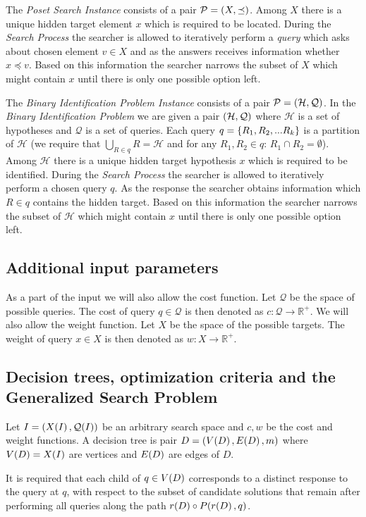 The \textit{Poset Search Instance} consists of a pair $\mathcal{P}=\mathopen{}\left( X, \preceq \right)$. Among $X$ there is a unique hidden target element $x$ which is required
to be located. During the \textit{Search Process} the searcher is allowed to iteratively perform a \textit{query} which asks about chosen element $v\in X$ and as the answers receives information whether $x\preceq v$. Based on this information the searcher narrows the subset of $X$ which might contain $x$ until there is only one possible option left.

The \textit{Binary Identification Problem Instance} consists of a pair $\mathcal{P}=\mathopen{}\left( \mathcal{H}, \mathcal{Q} \right)$. In the \textit{Binary Identification Problem} we are given a pair $\mathopen{}\left( \mathcal{H}, \mathcal{Q} \right)$ where $\mathcal{H}$ is a set of hypotheses and $\mathcal{Q}$ is a set of queries. Each query $q = \mathopen{}\left\{ R_1, R_2,...R_k \right\}$ is a partition of $\mathcal{H}$ (we require that $\bigcup_{R\in q}R=\mathcal{H}$ and for any $R_1,R_2\in q$: $R_1\cap R_2=\emptyset$). Among $\mathcal{H}$ there is a unique hidden target hypothesis $x$ which is required
to be identified. During the \textit{Search Process} the searcher is allowed to iteratively perform a chosen query $q$. As the response the searcher obtains information which $R\in q$ contains the hidden target. Based on this information the searcher narrows the subset of $\mathcal{H}$ which might contain $x$ until there is only one possible option left.
\subsection{Additional input parameters}
As a part of the input we will also allow the cost function. Let $\mathcal{Q}$ be the space of possible queries. The cost of query $q\in\mathcal{Q}$ is then denoted
as $c:\mathcal{Q}\to \mathbb{R}^+$. We will also allow the weight function. Let $X$ be the space of the possible targets. The weight of query $x\in X$ is then denoted
as $w:X\to \mathbb{R}^+$. 
\subsection{Decision trees, optimization criteria and the Generalized Search Problem}
Let $I=\mathopen{}\left( X\mathopen{}\left( I \right), \mathcal{Q}\mathopen{}\left( I \right) \right)$ be an arbitrary search space and $c,w$ be the cost and weight functions. A decision tree is pair $D=(V\mathopen{}\left( D \right), E\mathopen{}\left( D \right), m)$ where $V\mathopen{}\left( D \right)=X\mathopen{}\left( I \right)$ are vertices and $E\mathopen{}\left( D \right)$ are edges of $D$. 

It is required that each child of $q\in V\mathopen{}\left( 
D \right)$ corresponds to a distinct response to the query at $q$, with respect to the subset of candidate solutions that remain after performing all queries along the path $r\mathopen{}\left( D \right)\circ P\mathopen{}\left( r\mathopen{}\left( D \right), q \right)$. 

